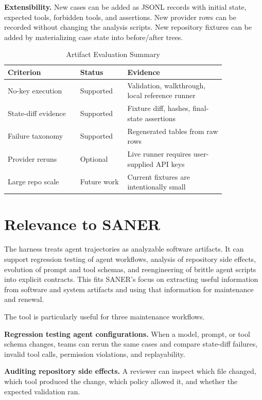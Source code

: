\documentclass[10pt,conference]{IEEEtran}
\begin{document}
\textbf{Extensibility.} New cases can be added as JSONL records with initial
state, expected tools, forbidden tools, and assertions. New provider rows can
be recorded without changing the analysis scripts. New repository fixtures can
be added by materializing case state into before/after trees.

\begin{table}[t]
\caption{Artifact Evaluation Summary}
\centering
\begin{tabular}{p{0.28\linewidth}p{0.18\linewidth}p{0.38\linewidth}}
\toprule
Criterion & Status & Evidence \\
\midrule
No-key execution & Supported & Validation, walkthrough, local reference runner \\
State-diff evidence & Supported & Fixture diff, hashes, final-state assertions \\
Failure taxonomy & Supported & Regenerated tables from raw rows \\
Provider reruns & Optional & Live runner requires user-supplied API keys \\
Large repo scale & Future work & Current fixtures are intentionally small \\
\bottomrule
\end{tabular}
\end{table}

\section{Relevance to SANER}

The harness treats agent trajectories as analyzable software artifacts. It can
support regression testing of agent workflows, analysis of repository side
effects, evolution of prompt and tool schemas, and reengineering of brittle
agent scripts into explicit contracts. This fits SANER's focus on extracting
useful information from software and system artifacts and using that information
for maintenance and renewal.

The tool is particularly useful for three maintenance workflows.

\textbf{Regression testing agent configurations.} When a model, prompt, or tool
schema changes, teams can rerun the same cases and compare state-diff failures,
invalid tool calls, permission violations, and replayability.

\textbf{Auditing repository side effects.} A reviewer can inspect which file
changed, which tool produced the change, which policy allowed it, and whether
the expected validation ran.
\end{document}
